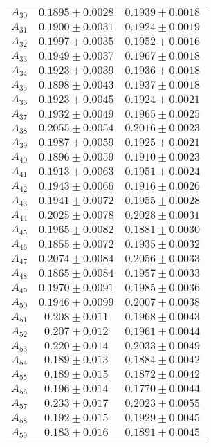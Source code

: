 \begin{tabular}{c|c|c}
$A_30$ & $0.1895\pm0.0028$ & $0.1939\pm0.0018$ \\
$A_31$ & $0.1900\pm0.0031$ & $0.1924\pm0.0019$ \\
$A_32$ & $0.1997\pm0.0035$ & $0.1952\pm0.0016$ \\
$A_33$ & $0.1949\pm0.0037$ & $0.1967\pm0.0018$ \\
$A_34$ & $0.1923\pm0.0039$ & $0.1936\pm0.0018$ \\
$A_35$ & $0.1898\pm0.0043$ & $0.1937\pm0.0018$ \\
$A_36$ & $0.1923\pm0.0045$ & $0.1924\pm0.0021$ \\
$A_37$ & $0.1932\pm0.0049$ & $0.1965\pm0.0025$ \\
$A_38$ & $0.2055\pm0.0054$ & $0.2016\pm0.0023$ \\
$A_39$ & $0.1987\pm0.0059$ & $0.1925\pm0.0021$ \\
$A_40$ & $0.1896\pm0.0059$ & $0.1910\pm0.0023$ \\
$A_41$ & $0.1913\pm0.0063$ & $0.1951\pm0.0024$ \\
$A_42$ & $0.1943\pm0.0066$ & $0.1916\pm0.0026$ \\
$A_43$ & $0.1941\pm0.0072$ & $0.1955\pm0.0028$ \\
$A_44$ & $0.2025\pm0.0078$ & $0.2028\pm0.0031$ \\
$A_45$ & $0.1965\pm0.0082$ & $0.1881\pm0.0030$ \\
$A_46$ & $0.1855\pm0.0072$ & $0.1935\pm0.0032$ \\
$A_47$ & $0.2074\pm0.0084$ & $0.2056\pm0.0033$ \\
$A_48$ & $0.1865\pm0.0084$ & $0.1957\pm0.0033$ \\
$A_49$ & $0.1970\pm0.0091$ & $0.1985\pm0.0036$ \\
$A_50$ & $0.1946\pm0.0099$ & $0.2007\pm0.0038$ \\
$A_51$ & $0.208\pm0.011$ & $0.1968\pm0.0043$ \\
$A_52$ & $0.207\pm0.012$ & $0.1961\pm0.0044$ \\
$A_53$ & $0.220\pm0.014$ & $0.2033\pm0.0049$ \\
$A_54$ & $0.189\pm0.013$ & $0.1884\pm0.0042$ \\
$A_55$ & $0.189\pm0.015$ & $0.1872\pm0.0042$ \\
$A_56$ & $0.196\pm0.014$ & $0.1770\pm0.0044$ \\
$A_57$ & $0.233\pm0.017$ & $0.2023\pm0.0055$ \\
$A_58$ & $0.192\pm0.015$ & $0.1929\pm0.0045$ \\
$A_59$ & $0.183\pm0.016$ & $0.1891\pm0.0045$ \\

\end{tabular}
